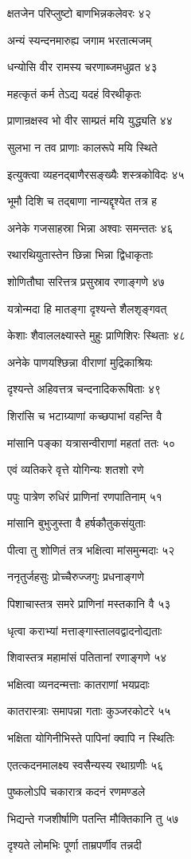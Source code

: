 क्षतजेन परिप्लुष्टो बाणभिन्नकलेवरः ४२

अन्यं स्यन्दनमारुह्य जगाम भरतात्मजम्

धन्योसि वीर रामस्य चरणाब्जमधुव्रत ४३

महत्कृतं कर्म तेऽद्य यदहं विरथीकृतः

प्राणान्रक्षस्व भो वीर साम्प्रतं मयि युद्ध्यति ४४

सुलभा न तव प्राणाः कालरूपे मयि स्थिते

इत्युक्त्वा व्यहनद्बाणैरसङ्ख्यैः शस्त्रकोविदः ४५

भूमौ दिशि च तद्बाणा नान्यद्दृश्येत तत्र ह

अनेके गजसाहस्रा भिन्ना अश्वाः समन्ततः ४६

रथारथियुतास्तेन छिन्ना भिन्ना द्विधाकृताः

शोणितौघा सरित्तत्र प्रसुस्राव रणाङ्गणे ४७

यत्रोन्मदा हि मातङ्गा दृश्यन्ते शैलशृङ्गवत्

केशाः शैवाललक्ष्यास्ते मुहुः प्राणिशिरः स्थिताः ४८

अनेके पाणयश्छिन्ना वीराणां मुद्रिकाश्रियः

दृश्यन्ते अहिवत्तत्र चन्दनादिकरूषिताः ४९

शिरांसि च भटाग्र्याणां कच्छपाभां वहन्ति वै

मांसानि पङ्का यत्रासन्वीराणां महतां ततः ५०

एवं व्यतिकरे वृत्ते योगिन्यः शतशो रणे

पपुः पात्रेण रुधिरं प्राणिनां रणपातिनाम् ५१

मांसानि बुभुजुस्ता वै हर्षकौतुकसंयुताः

पीत्वा तु शोणितं तत्र भक्षित्वा मांसमुन्मदाः ५२

ननृतुर्जहसुः प्रोच्चैरुज्जगुः प्रधनाङ्गणे

पिशाचास्तत्र समरे प्राणिनां मस्तकानि वै ५३

धृत्वा कराभ्यां मत्ताङ्गास्तालवद्वादनोद्यताः

शिवास्तत्र महामांसं पतितानां रणाङ्गणे ५४

भक्षित्वा व्यनदन्मत्ताः कातराणां भयप्रदाः

कातरास्त्राः समापन्ना गताः कुञ्जरकोटरे ५५

भक्षिता योगिनीभिस्ते पापिनां क्वापि न स्थितिः

एतत्कदनमालक्ष्य स्वसैन्यस्य रथाग्रणीः ५६

पुष्कलोऽपि चकारात्र कदनं रणमण्डले

भिद्यन्ते गजशीर्षाणि पतन्ति मौक्तिकानि तु ५७

दृश्यते लोमभिः पूर्णा ताम्रपर्णीव तन्नदी

